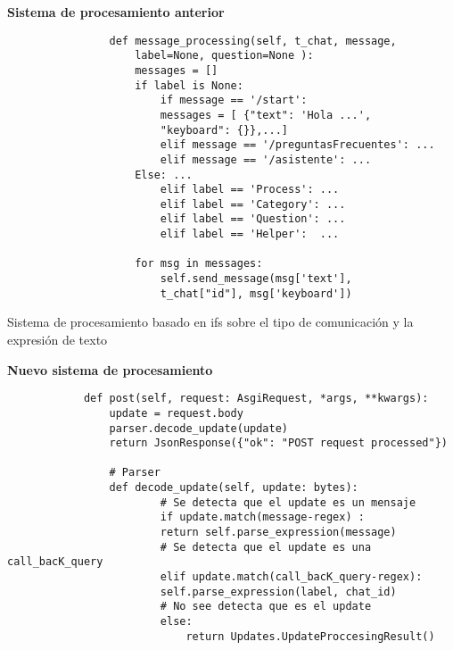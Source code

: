         \textbf{Sistema de procesamiento anterior}
        \begin{listing}
            \begin{verbatim}
                def message_processing(self, t_chat, message, 
                    label=None, question=None ):
                    messages = []
                    if label is None:
                        if message == '/start':
                        messages = [ {"text": 'Hola ...',
                        "keyboard": {}},...]
                        elif message == '/preguntasFrecuentes': ...
                        elif message == '/asistente': ... 
                    Else: ...
                        elif label == 'Process': ...
                        elif label == 'Category': ...
                        elif label == 'Question': ...
                        elif label == 'Helper':  ...
                    
                    for msg in messages:
                        self.send_message(msg['text'],
                        t_chat["id"], msg['keyboard'])
            \end{verbatim}
             \caption[sistema de procesamiento anterior]{Sistema de procesamiento basado en ifs sobre el tipo de comunicación y la expresión de texto}
        \end{listing}

        \textbf{Nuevo sistema de procesamiento}
        \begin{verbatim}
            def post(self, request: AsgiRequest, *args, **kwargs):
                update = request.body
                parser.decode_update(update)
                return JsonResponse({"ok": "POST request processed"})
            
                # Parser
                def decode_update(self, update: bytes):
                        # Se detecta que el update es un mensaje
                        if update.match(message-regex) :
                        return self.parse_expression(message)
                        # Se detecta que el update es una call_bacK_query
                        elif update.match(call_bacK_query-regex):
                        self.parse_expression(label, chat_id)
                        # No see detecta que es el update
                        else:
                            return Updates.UpdateProccesingResult()
        \end{verbatim}




